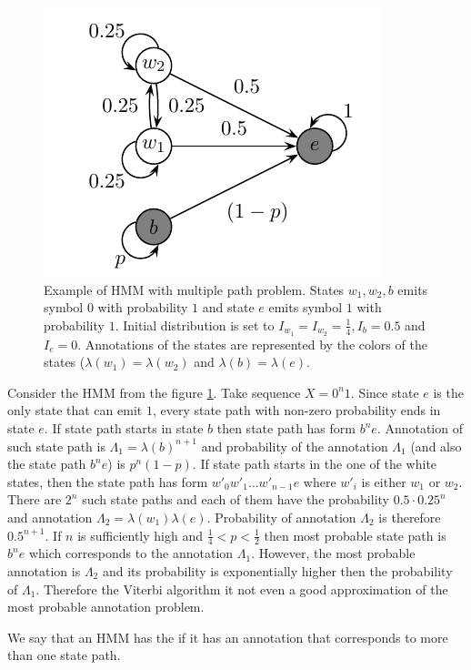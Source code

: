 \begin{figure}
\begin{center}
\includegraphics{../figures/multiplePathProblemHMM.pdf}
\end{center}
\caption[Hidden Markov Model with multiple path problem.]{Example of HMM with
multiple path problem. States $w_1,w_2,b$ emits symbol $0$ with probability $1$
and state $e$ emits symbol $1$ with probability $1$. Initial distribution is set
to $I_{w_1}=I_{w_2}=\frac14, I_{b}=0.5$
and $I_e=0$. Annotations of the states are represented by the colors of the states
($\lambda(w_1)=\lambda(w_2)$ and $\lambda(b)=\lambda(e)$. }\label{FIGURE:BADVITERBIEXAMPLE}
\end{figure}

\begin{example}
Consider the HMM from the figure \ref{FIGURE:BADVITERBIEXAMPLE}. Take sequence $X=0^n1$.
Since state $e$ is the only state that can emit $1$, every state path with non-zero
probability ends in state $e$. If state path starts in state $b$ then state
path has form $b^ne$. Annotation of such state path is $\Lambda_1=\lambda(b)^{n+1}$
and probability of the annotation $\Lambda_1$ (and also the state path $b^ne$) is $p^n(1-p)$.
If state path starts in the one of the white states, then the state path
has form $w'_0w'_1\dots w'_{n-1}e$ where $w'_i$ is either $w_1$ or $w_2$.
There are $2^n$ such state paths and each of them have the probability $0.5\cdot
0.25^n$ and annotation $\Lambda_2=\lambda(w_1)\lambda(e)$. Probability of
annotation $\Lambda_2$ is therefore $0.5^{n+1}$.
If $n$ is sufficiently high and $\frac14<p<\frac12$ then most probable state
path is $b^ne$ which corresponds to the annotation $\Lambda_1$. However, the most
probable annotation is $\Lambda_2$ and its probability is exponentially higher
then the probability of $\Lambda_1$. Therefore the Viterbi algorithm it not even a
good approximation of the most probable annotation problem.

We say that an HMM has the  if it has an annotation that
corresponds to more than one state path.
\end{example}


